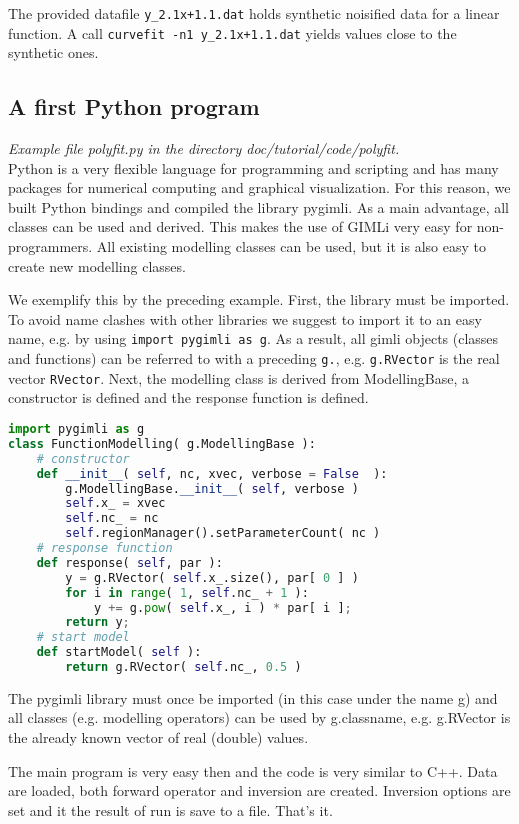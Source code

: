 The provided datafile \verb|y_2.1x+1.1.dat| holds synthetic noisified data for a linear function.
A call \verb|curvefit -n1 y_2.1x+1.1.dat| yields values close to the synthetic ones.

\subsection{A first Python program}
{\em Example file polyfit.py in the directory doc/tutorial/code/polyfit.}\\
Python is a very flexible language for programming and scripting and has many packages for numerical computing and graphical visualization.
For this reason, we built Python bindings and compiled the library pygimli.
As a main advantage, all classes can be used and derived.
This makes the use of GIMLi very easy for non-programmers.
All existing modelling classes can be used, but it is also easy to create new modelling classes.

We exemplify this by the preceding example.
First, the library must be imported.
To avoid name clashes with other libraries we suggest to import it to an easy name, e.g. by using \lstinline|import pygimli as g|.
As a result, all gimli objects (classes and functions) can be referred to with a preceding \lstinline|g.|, e.g. \lstinline|g.RVector| is the real vector \lstinline|RVector|.
Next, the modelling class is derived from ModellingBase, a constructor is defined and the response function is defined.
\begin{lstlisting}[language=python]
import pygimli as g
class FunctionModelling( g.ModellingBase ):
    # constructor
    def __init__( self, nc, xvec, verbose = False  ):
        g.ModellingBase.__init__( self, verbose )
        self.x_ = xvec
        self.nc_ = nc
        self.regionManager().setParameterCount( nc )
    # response function
    def response( self, par ):
        y = g.RVector( self.x_.size(), par[ 0 ] )
        for i in range( 1, self.nc_ + 1 ):
            y += g.pow( self.x_, i ) * par[ i ];
        return y;
    # start model
    def startModel( self ):
        return g.RVector( self.nc_, 0.5 )
\end{lstlisting}

The pygimli library must once be imported (in this case under the name g) and all classes (e.g. modelling operators) can be used by g.classname, e.g. g.RVector is the already known vector of real (double) values.

The main program is very easy then and the code is very similar to C++.
Data are loaded, both forward operator and inversion are created.
Inversion options are set and it the result of run is save to a file.
That's it.

